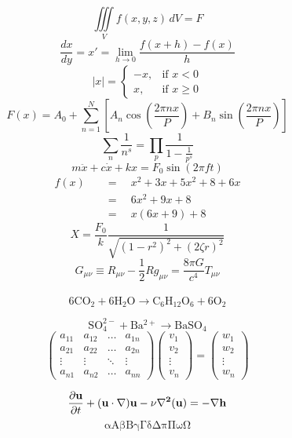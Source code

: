 \documentclass[12pt]{article}
\begin{document}
\begin{equation*}
\iiint\limits_V f(x,y,z)\,dV = F
\end{equation*}
\begin{equation*}
\frac{dx}{dy}=x'=\lim_{h \to 0}\frac{f(x+h)-f(x)}{h}
\end{equation*}
\begin{equation*}
|x|=\begin{cases}
-x, & \text{if $x < 0$}\\
x, & \text{if $x \geq 0$} 
\end{cases}
\end{equation*}
\begin{equation*}
F(x)= A_0 + \sum_{n=1}^N\left[ A_n\cos{\left(\frac{2\pi nx}{P}\right)}+B_n\sin{\left(\frac{2\pi nx}{P}\right)}\right]
\end{equation*}
\begin{equation*}
\sum_n \frac{1}{n^s}=\prod_p \frac{1}{1-\frac{1}{p^s}}
\end{equation*}
\begin{equation*}        
m\ddot{x}+c\dot{x}+kx=F_0\sin(2\pi ft)
\end{equation*}
\begin{align*} %
f(x)\quad &=\quad x^2 + 3x + 5x^2 +8 +6x\\
&=\quad 6x^2 +9x +8\\
&=\quad x(6x+9)+8
\end{align*}
$$
X=\frac{F_0}{k}\frac{1}{\sqrt{(1-r^2)^2+(2\zeta r)^2}}
$$
\begin{equation*}
G_{\mu\nu} \equiv R_{\mu\nu}-\frac{1}{2}Rg_{\mu\nu}=\frac{8\pi G}{c^4}T_{\mu\nu}
\end{equation*}\\
$$\mathrm{6CO_2+6H_2O \to C_6H_{12}O_6+6O_2}$$ 

$$\mathrm{SO_4^{2-}+Ba^{2+} \to BaSO_4 }$$
\begin{equation*}
\begin{pmatrix}
a_{11}&a_{12}&\dots&a_{1n}\\
a_{21}&a_{22}&\dots&a_{2n}\\
\vdots&\vdots&\ddots&\vdots\\
a_{n1}&a_{n2}&\dots&a_{nn}
\end{pmatrix}
\begin{pmatrix}
v_1\\
v_2\\
\vdots\\
v_n
\end{pmatrix}
=
\begin{pmatrix}
w_1\\
w_2\\
\vdots\\
w_n
\end{pmatrix}
\end{equation*}

\begin{equation*}
\frac{\partial{\bf{u}}}{\partial{t}}+(\bf{u}\cdot\nabla)\bf{u}-\nu\nabla^2\bf(u)=-\nabla h
\end{equation*}
$$
\mathrm{\alpha A \beta B \gamma \Gamma \delta \Delta \pi \Pi \omega \Omega} 
$$
\end{document}

